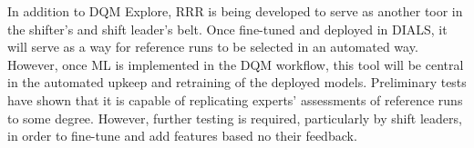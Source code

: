 In addition to DQM Explore, RRR is being developed to serve as another toor in the shifter's and shift leader's belt. Once fine-tuned and deployed in DIALS, it will serve as a way for reference runs to be selected in an automated way. However, once ML is implemented in the DQM workflow, this tool will be central in the automated upkeep and retraining of the deployed models. Preliminary tests have shown that it is capable of replicating experts' assessments of reference runs to some degree. However, further testing is required, particularly by shift leaders, in order to fine-tune and add features based no their feedback.